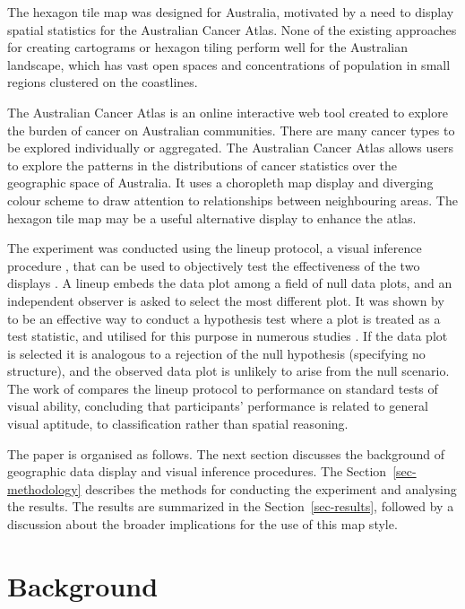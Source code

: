 \documentclass[
doublespace,
  times]{anzsauth}
\begin{document}
The hexagon tile map was designed for Australia, motivated by a need to
display spatial statistics for the Australian Cancer Atlas. None of the
existing approaches for creating cartograms or hexagon tiling perform
well for the Australian landscape, which has vast open spaces and
concentrations of population in small regions clustered on the
coastlines.

The Australian Cancer Atlas \citep{atlas} is an online interactive web
tool created to explore the burden of cancer on Australian communities.
There are many cancer types to be explored individually or aggregated.
The Australian Cancer Atlas allows users to explore the patterns in the
distributions of cancer statistics over the geographic space of
Australia. It uses a choropleth map display and diverging colour scheme
to draw attention to relationships between neighbouring areas. The
hexagon tile map may be a useful alternative display to enhance the
atlas.

The experiment was conducted using the lineup protocol, a visual
inference procedure \citep{BCHLLSW09, GIIV}, that can be used to
objectively test the effectiveness of the two displays \citep{GTPCCD}. A
lineup embeds the data plot among a field of null data plots, and an
independent observer is asked to select the most different plot. It was
shown by \citet{VVSIALM} to be an effective way to conduct a hypothesis
test where a plot is treated as a test statistic, and utilised for this
purpose in numerous studies \citep{FFS, Green2021, LCTV}. If the data
plot is selected it is analogous to a rejection of the null hypothesis
(specifying no structure), and the observed data plot is unlikely to
arise from the null scenario. The work of \citet{VH2016} compares the
lineup protocol to performance on standard tests of visual ability,
concluding that participants' performance is related to general visual
aptitude, to classification rather than spatial reasoning.

The paper is organised as follows. The next section discusses the
background of geographic data display and visual inference procedures.
The Section~\ref{sec-methodology} describes the methods for conducting
the experiment and analysing the results. The results are summarized in
the Section~\ref{sec-results}, followed by a discussion about the
broader implications for the use of this map style.

\section{Background}\label{sec-background}
\end{document}
